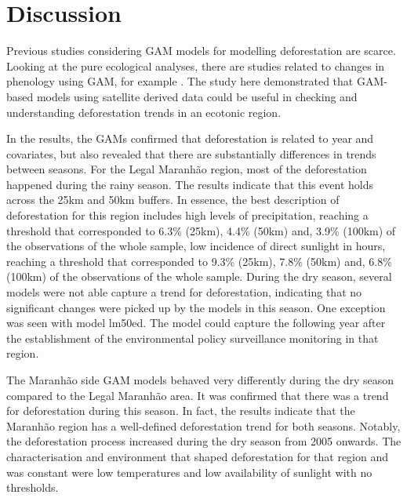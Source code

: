 \section{Discussion} \label{ref:discussion}

Previous studies considering GAM models for modelling deforestation are scarce. Looking at the pure ecological analyses, there are studies related to changes in phenology using GAM, for example \citet{TAPIA_2017}. The study here demonstrated that GAM-based models using satellite derived data could be useful in checking and understanding deforestation trends in an ecotonic region. 


In the results, the GAMs confirmed that deforestation is related to year and covariates, but also revealed that there are substantially differences in trends between seasons. For the Legal Maranhão region, most of the deforestation happened during the rainy season. The results indicate that this event holds across the 25km and 50km buffers. In essence, the best description of deforestation for this region includes high levels of precipitation, reaching a threshold that corresponded to 6.3\% (25km), 4.4\% (50km) and, 3.9\% (100km) of the observations of the whole sample, low incidence of direct sunlight in hours, reaching a threshold that corresponded to 9.3\% (25km), 7.8\% (50km) and, 6.8\% (100km) of the observations of the whole sample. During the dry season, several models were not able capture a trend for deforestation, indicating that no significant changes were picked up by the models in this season. One exception was seen with model lm50ed. The model could capture the following year after the establishment of the environmental policy surveillance monitoring in that region.

The Maranhão side GAM models behaved very differently during the dry season compared to the Legal Maranhão area. It was confirmed that there was a trend for deforestation during this season. In fact, the results indicate that the Maranhão region has a well-defined deforestation trend for both seasons. Notably, the deforestation process increased during the dry season from 2005 onwards. The characterisation and environment that shaped deforestation for that region and was constant were low temperatures and low availability of sunlight with no thresholds. 


